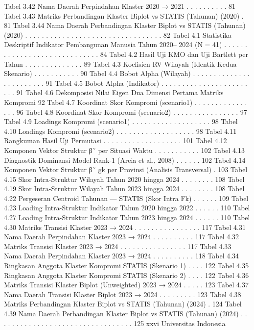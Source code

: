 Tabel 3.42 Nama Daerah Perpindahan Klaster 2020 → 2021 . . . . . . . . . . 81
Tabel 3.43 Matriks Perbandingan Klaster Biplot vs STATIS (Tahunan) (2020) . 81
Tabel 3.44 Nama Daerah Perbandingan Klaster Biplot vs STATIS (Tahunan)
(2020) . . . . . . . . . . . . . . . . . . . . . . . . . . . . . . . . . 82
Tabel 4.1 Statistika Deskriptif Indikator Pembangunan Manusia Tahun 2020–
2024 (N = 41) . . . . . . . . . . . . . . . . . . . . . . . . . . . . . 84
Tabel 4.2 Hasil Uji KMO dan Uji Bartlett per Tahun . . . . . . . . . . . . . . 89
Tabel 4.3 Koefisien RV Wilayah (Identik Kedua Skenario) . . . . . . . . . . . 90
Tabel 4.4 Bobot Alpha (Wilayah) . . . . . . . . . . . . . . . . . . . . . . . . 91
Tabel 4.5 Bobot Alpha (Indikator) . . . . . . . . . . . . . . . . . . . . . . . . 91
Tabel 4.6 Dekomposisi Nilai Eigen Dua Dimensi Pertama Matriks Kompromi 92
Tabel 4.7 Koordinat Skor Kompromi (scenario1) . . . . . . . . . . . . . . . . 96
Tabel 4.8 Koordinat Skor Kompromi (scenario2) . . . . . . . . . . . . . . . . 97
Tabel 4.9 Loadings Kompromi (scenario1) . . . . . . . . . . . . . . . . . . . 98
Tabel 4.10 Loadings Kompromi (scenario2) . . . . . . . . . . . . . . . . . . . 98
Tabel 4.11 Rangkuman Hasil Uji Permutasi . . . . . . . . . . . . . . . . . . . 101
Tabel 4.12 Komponen Vektor Struktur β˜ per Situasi Waktu . . . . . . . . . . . 102
Tabel 4.13 Diagnostik Dominansi Model Rank-1 (Areia et al., 2008) . . . . . . 102
Tabel 4.14 Komponen Vektor Struktur β˜
gk per Provinsi (Analisis Transversal) . 103
Tabel 4.15 Skor Intra-Struktur Wilayah Tahun 2020 hingga 2024 . . . . . . . . 108
Tabel 4.19 Skor Intra-Struktur Wilayah Tahun 2023 hingga 2024 . . . . . . . . 108
Tabel 4.22 Pergeseran Centroid Tahunan — STATIS (Skor Intra Fk) . . . . . . 109
Tabel 4.23 Loading Intra-Struktur Indikator Tahun 2020 hingga 2022 . . . . . . 110
Tabel 4.27 Loading Intra-Struktur Indikator Tahun 2023 hingga 2024 . . . . . . 110
Tabel 4.30 Matriks Transisi Klaster 2023 → 2024 . . . . . . . . . . . . . . . . 117
Tabel 4.31 Nama Daerah Perpindahan Klaster 2023 → 2024 . . . . . . . . . . 117
Tabel 4.32 Matriks Transisi Klaster 2023 → 2024 . . . . . . . . . . . . . . . . 117
Tabel 4.33 Nama Daerah Perpindahan Klaster 2023 → 2024 . . . . . . . . . . 118
Tabel 4.34 Ringkasan Anggota Klaster Kompromi STATIS (Skenario 1) . . . . 122
Tabel 4.35 Ringkasan Anggota Klaster Kompromi STATIS (Skenario 2) . . . . 122
Tabel 4.36 Matriks Transisi Klaster Biplot (Unweighted) 2023 → 2024 . . . . . 123
Tabel 4.37 Nama Daerah Transisi Klaster Biplot 2023 → 2024 . . . . . . . . . 123
Tabel 4.38 Matriks Perbandingan Klaster Biplot vs STATIS (Tahunan) (2024) . 124
Tabel 4.39 Nama Daerah Perbandingan Klaster Biplot vs STATIS (Tahunan)
(2024) . . . . . . . . . . . . . . . . . . . . . . . . . . . . . . . . . 125
xxvi Universitas Indonesia

